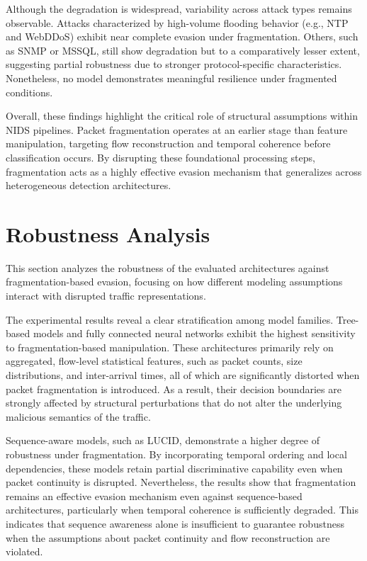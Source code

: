 Although the degradation is widespread, variability across attack types remains observable. Attacks characterized by high-volume flooding behavior (e.g., NTP and WebDDoS) exhibit near complete evasion under fragmentation. Others, such as SNMP or MSSQL, still show degradation but to a comparatively lesser extent, suggesting partial robustness due to stronger protocol-specific characteristics. Nonetheless, no model demonstrates meaningful resilience under fragmented conditions.

Overall, these findings highlight the critical role of structural assumptions within NIDS pipelines. Packet fragmentation operates at an earlier stage than feature manipulation, targeting flow reconstruction and temporal coherence before classification occurs. By disrupting these foundational processing steps, fragmentation acts as a highly effective evasion mechanism that generalizes across heterogeneous detection architectures.

\section{Robustness Analysis}

This section analyzes the robustness of the evaluated architectures against fragmentation-based evasion, focusing on how different modeling assumptions interact with disrupted traffic representations.

The experimental results reveal a clear stratification among model families. Tree-based models and fully connected neural networks exhibit the highest sensitivity to fragmentation-based manipulation. These architectures primarily rely on aggregated, flow-level statistical features, such as packet counts, size distributions, and inter-arrival times, all of which are significantly distorted when packet fragmentation is introduced. As a result, their decision boundaries are strongly affected by structural perturbations that do not alter the underlying malicious semantics of the traffic.

Sequence-aware models, such as LUCID, demonstrate a higher degree of robustness under fragmentation. By incorporating temporal ordering and local dependencies, these models retain partial discriminative capability even when packet continuity is disrupted. Nevertheless, the results show that fragmentation remains an effective evasion mechanism even against sequence-based architectures, particularly when temporal coherence is sufficiently degraded. This indicates that sequence awareness alone is insufficient to guarantee robustness when the assumptions about packet continuity and flow reconstruction are violated.

